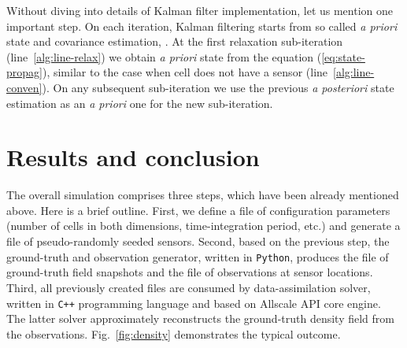 \documentclass[acmsmall,review,anonymous]{acmart}\settopmatter{printfolios=true,printccs=false,printacmref=false}
\begin{document}
Without diving into details of Kalman filter implementation, let us mention one important step. On each iteration, Kalman filtering starts from so called \textit{a priori} state and covariance estimation, \cite{Welch06}. At the first relaxation sub-iteration (line~\ref{alg:line-relax}) we obtain \textit{a priori} state from the equation (\ref{eq:state-propag}), similar to the case when cell does not have a sensor (line~\ref{alg:line-conven}). On any subsequent sub-iteration we use the previous \textit{a posteriori} state estimation as an \textit{a priori} one for the new sub-iteration.

\section{Results and conclusion}

The overall simulation comprises three steps, which have been already mentioned above. Here is a brief outline. First, we define a file of configuration parameters (number of cells in both dimensions, time-integration period, etc.) and generate a file of pseudo-randomly seeded sensors. Second, based on the previous step, the ground-truth and observation generator, written in \texttt{Python}, produces the file of ground-truth field snapshots and the file of observations at sensor locations. Third, all previously created files are consumed by data-assimilation solver, written in \texttt{C++} programming language and based on Allscale API core engine. The latter solver approximately reconstructs the ground-truth density field from the observations. Fig.~\ref{fig:density} demonstrates the typical outcome.
\end{document}
